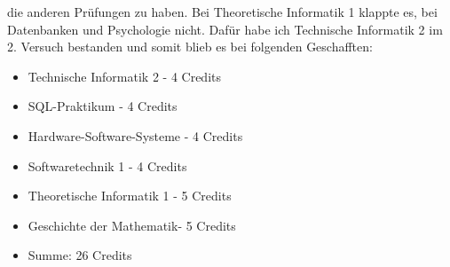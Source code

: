 die anderen Prüfungen zu haben. Bei Theoretische Informatik 1 klappte
es, bei Datenbanken und Psychologie nicht. Dafür habe ich Technische Informatik 2 im
2. Versuch bestanden und somit blieb es bei folgenden Geschafften:
\begin{itemize}
\item Technische Informatik 2 - 4 Credits
\item SQL-Praktikum - 4 Credits
\item Hardware-Software-Systeme - 4 Credits
\item Softwaretechnik 1 - 4 Credits
\item Theoretische Informatik 1 - 5 Credits
\item Geschichte der Mathematik- 5 Credits
\item Summe: 26 Credits
\end{itemize}

